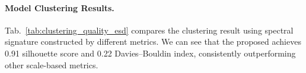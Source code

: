 
\paragraph{Model Clustering Results. }







Tab.~\ref{tab:clustering_quality_esd} compares the clustering result using spectral signature constructed by different metrics. We can see that the proposed \ALPHAHILL achieves 0.91 silhouette score and 0.22 Davies–Bouldin index, consistently outperforming other scale-based metrics. 

